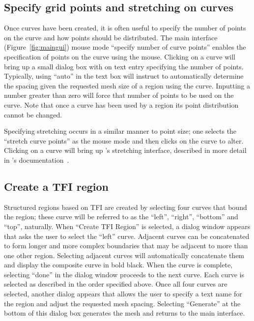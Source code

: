 \documentclass[letterpaper,12pt]{article}
\begin{document}
\subsection{Specify grid points and stretching on curves}
Once curves have been created, it is often useful to specify the
number of points on the curve and how points should be distributed.
The main interface (Figure~\ref{fig:maingui}) mouse mode ``specify
number of curve points'' enables the specification of points on the
curve using the mouse.  Clicking on a curve will bring up a small
dialog box with on text entry specifying the number of points.
Typically, using ``auto'' in the text box will instruct \smesh to
automatically determine the spacing given the requested mesh size of a
region using the curve.  Inputting a number greater than zero will
force that number of points to be used on the curve.  Note that once a
curve has been used by a region its point distribution cannot be
changed.

Specifying stretching occurs in a similar manner to point size; one
selects the ``stretch curve points'' as the mouse mode and then clicks
on the curve to alter.  Clicking on a curve will bring up \overt's
stretching interface, described in more detail in \overt's
documentation~\cite{ovdocs}.  
\subsection{Create a {TFI} region}\label{sec:tfi}
Structured regions based on {TFI} are created by selecting four curves
that bound the region; these curve will be referred to as the
``left'', ``right'', ``bottom'' and ``top'', naturally.  When ``Create
{TFI} Region'' is selected, a dialog window appears that asks the user
to select the ``left'' curve.  Adjacent curves can be concatenated to
form longer and more complex boundaries that may be adjacent to more
than one other region.  Selecting adjacent curves will automatically
concatenate them and display the composite curve in bold black.  When
the curve is complete, selecting ``done'' in the dialog window
proceeds to the next curve.  Each curve is selected as described in
the order specified above.  Once all four curves are selected, another
dialog appears that allows the user to specify a text name for the
region and adjust the requested mesh spacing.  Selecting ``Generate'' at the
bottom of this dialog box generates the mesh and returns to the main
interface.
\end{document}

